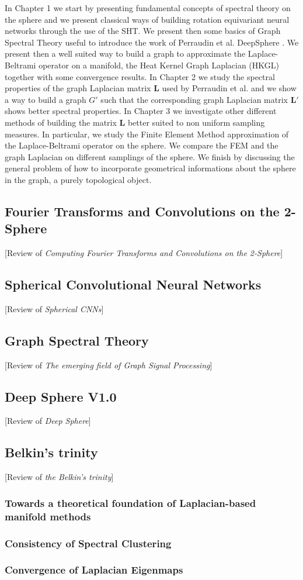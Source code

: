 In Chapter 1 we start by presenting fundamental concepts of spectral theory on the sphere and we present classical ways of building rotation equivariant neural networks through the use of the SHT.  We present then some basics of Graph Spectral Theory useful to introduce the work of Perraudin et al. DeepSphere \cite{DeepSphere}. We present then a well suited way to build a graph to approximate the Laplace-Beltrami operator on a manifold, the Heat Kernel Graph Laplacian (HKGL) together with some convergence results. In Chapter 2 we study the spectral properties of the graph Laplacian matrix $\mathbf L$ used by Perraudin et al. and we show a way to build a graph $G'$ such that the corresponding graph Laplacian matrix $\mathbf L'$ shows better spectral properties. In Chapter 3 we investigate other different methods of building the matrix $\mathbf L$ better suited to non uniform sampling measures. In particular, we study the Finite Element Method approximation of the Laplace-Beltrami operator on the sphere. We compare the FEM and the graph Laplacian on different samplings of the sphere. We finish by discussing the general problem of how to incorporate geometrical informations about the sphere in the graph, a purely topological object.

\subsection{Fourier Transforms and Convolutions on the 2-Sphere}
[Review of \textit{Computing Fourier Transforms and Convolutions on the 2-Sphere}]
\subsection{Spherical Convolutional Neural Networks}
[Review of \textit{Spherical CNNs}]
\subsection{Graph Spectral Theory} \label{sec:Chapter1: Spectral Graph Theory}
[Review of \textit{The emerging field of Graph Signal Processing}]
\subsection{Deep Sphere V1.0}
[Review of \textit{Deep Sphere}]
\subsection{Belkin's trinity}
[Review of \textit{the Belkin's trinity}]

\subsubsection{Towards a theoretical foundation of Laplacian-based manifold methods}

\subsubsection{Consistency of Spectral Clustering}

\subsubsection{Convergence of Laplacian Eigenmaps}

